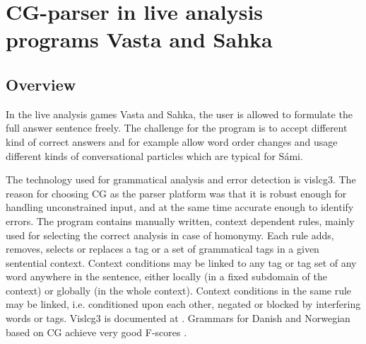\documentclass[11pt]{article}
\begin{document}
\section{CG-parser in live analysis programs Vasta and Sahka}\label{vastasahka}




\subsection{Overview}

In the live analysis games Vasta and Sahka, the user is allowed to formulate the full answer sentence freely. The challenge for the program is to accept different kind of correct answers and for example allow word order changes and usage different kinds of conversational particles which are typical for Sámi.

The technology used for grammatical analysis and error detection is vislcg3. The reason for choosing CG as the parser platform was that it is robust enough for handling unconstrained input, and at the same time accurate enough to identify errors. The program contains manually written, context dependent rules, mainly used for selecting the correct analysis in case of homonymy. Each rule adds, removes, selects or replaces a tag or a set of grammatical tags in a given sentential context. Context conditions may be linked to any tag or tag set of any word anywhere in the sentence, either locally (in a fixed subdomain of the context) or globally (in the whole context). Context conditions in the same rule may be linked, i.e. conditioned upon each other, negated or blocked by interfering words or tags. Vislcg3 is documented at \cite{Visl:08}. Grammars for Danish and Norwegian based on CG achieve very good F-scores \cite{Bick:03}.
\end{document}
